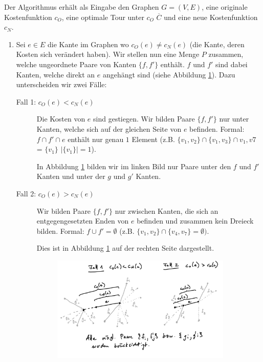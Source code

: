 \documentclass[a4paper,11pt]{scrreprt}
\begin{document}
Der Algorithmus erhält als Eingabe den Graphen $G = (V,E)$, eine originale Kostenfunktion $c_O$, eine optimale Tour unter $c_O$ $\overline{C}$ und eine neue Kostenfunktion $c_N$.

\begin{enumerate}
\item Sei $e \in E$ die Kante im Graphen wo $c_O(e) \not= c_N(e)$ (die Kante, deren Kosten sich verändert haben). Wir stellen nun eine Menge $P$ zusammen, welche ungeordnete Paare von Kanten $\{f, f'\}$ enthält. $f$ und $f'$ sind dabei Kanten, welche direkt an $e$ angehängt sind (siehe Abbildung \ref{fig:lm-beta-approx1}). Dazu unterscheiden wir zwei Fälle:

\begin{description}
\item[Fall 1: $c_O(e) < c_N(e)$] Die Kosten von $e$ sind gestiegen. Wir bilden Paare $\{f, f'\}$ nur unter Kanten, welche sich auf der gleichen Seite von $e$ befinden. Formal: $f \cap f' \cap e$ enthält nur genau $1$ Element (z.B. $\{v_1, v_2\} \cap \{v_1, v_3\} \cap {v_1, v7}$ = $\{v_1\}$ $|\{v_1\}| = 1$).

In Abbildung \ref{fig:lm-beta-approx1} bilden wir im linken Bild nur Paare unter den $f$ und $f'$ Kanten und unter der $g$ und 
$g'$ Kanten.

\item[Fall 2: $c_O(e) > c_N(e)$] Wir bilden Paare $\{f, f'\}$ nur zwischen Kanten, die sich an entgegengesetzten Enden von $e$ befinden und zusammen kein Dreieck bilden. Formal: $f \cup f' = \emptyset$ (z.B. $\{v_1, v_2\} \cap \{v_4, v_7\} = \emptyset)$.

Dies ist in Abbildung \ref{fig:lm-beta-approx1} auf der rechten Seite dargestellt.

\begin{figure}[H]
\centering
\includegraphics[width=0.9\textwidth]{lm_beta_approx1.png}
\caption{}
\label{fig:lm-beta-approx1}
\end{figure}


\end{description}
\end{enumerate}
\end{document}
